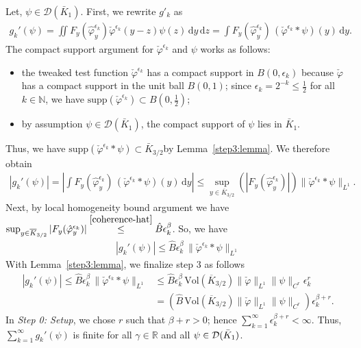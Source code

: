 Let, \(\psi \in \mathcal{D}(\bar K_1)\). First, we rewrite \(g'_k\) as 
\begin{align}\label{gk-formular}
    g_k'(\psi) = \iint F_y(\hat{\varphi}^{\epsilon_k}_{y}) \check \varphi^{\epsilon_k}(y-z) \psi(z) \, \mathrm{d}y \, \mathrm{d}z = \int F_y(\hat \varphi^{\epsilon_k}_y) \, (\check \varphi^{\epsilon_k} * \psi)(y) \, \mathrm{d}y.
\end{align}
The compact support argument for \(\check \varphi^{\epsilon_k}\) and \(\psi\) works as follows: 
\begin{itemize}
    \item the tweaked test function \(\check \varphi^{\epsilon_k}\) has a compact support in \(B(0, \epsilon_k)\) because \(\check \varphi\) has a compact support in the unit ball \(B(0,1)\); since \(\epsilon_k = 2^{-k} \leq \frac{1}{2}\) for all \(k \in \mathbb{N}\), we have \(\mathrm{supp} \left( \check \varphi^{\epsilon_k} \right) \subset B(0,\frac{1}{2})\);
    \item by assumption \(\psi \in \mathcal{D}(\bar K_1)\), the compact support of \(\psi\) lies in \(\bar K_1\).
\end{itemize}
Thus, we have \(\mathrm{supp} \left( \check \varphi^{\epsilon_k} * \psi \right) \subset \bar K_{3/2}\)by Lemma~\ref{step3:lemma}. We therefore obtain 
\begin{align*}
    |g_k'(\psi)| = \left|\int F_y(\hat \varphi^{\epsilon_k}_y) \, (\check \varphi^{\epsilon_k} * \psi)(y) \, \mathrm{d}y\right| 
    \leq \sup_{y \in \overline K_{3/2}} \left(|F_y(\hat \varphi^{\epsilon_k}_y)| \right) \lVert \check \varphi^{\epsilon_k} * \psi \rVert_{L^1}.
\end{align*}
Next, by {local homogeneity bound} argument we have \(
    \sup_{y \in \overline K_{3/2}} |F_y(\hat \varphi^{\epsilon_k}_y)|  \overset{\eqref{coherence-hat}}{\leq}  \hat B \epsilon_k^\beta
\). 
So, we have 
\begin{align*}
    |g_k'(\psi)| \leq \hat B \epsilon_k^\beta \, \lVert \check \varphi^{\epsilon_k} * \psi \rVert_{L^1}
\end{align*}
With Lemma~\ref{step3:lemma}, we finalize step 3 as follows 
\begin{align}
    |g_k'(\psi)| \leq \hat B \epsilon_k^\beta \, \lVert \check \varphi^{\epsilon_k} * \psi \rVert_{L^1} &\leq \hat B \epsilon_k^\beta \,  \mathrm{Vol}(\overline K_{3/2})  \lVert \check \varphi \rVert_{L^1} \lVert \psi \rVert_{C^r} \epsilon^r_k \nonumber \\
    &= \left( \hat B \, \mathrm{Vol}(\overline K_{3/2})  \lVert \check \varphi \rVert_{L^1} \lVert \psi \rVert_{C^r} \right)\epsilon^{\beta + r}_k. \label{Mustermkatze}
\end{align}
In \emph{Step 0: Setup}, we chose \(r\) such that  \(\beta + r > 0\); hence \(\sum_{k=1}^\infty \epsilon_k^{\beta + r} < \infty\). Thus, \(\sum^\infty_{k=1} g_k'(\psi)\) is finite for all \(\gamma \in \mathbb{R}\) and all \(\psi \in \mathcal{D}(\bar{K}_{1})\).

